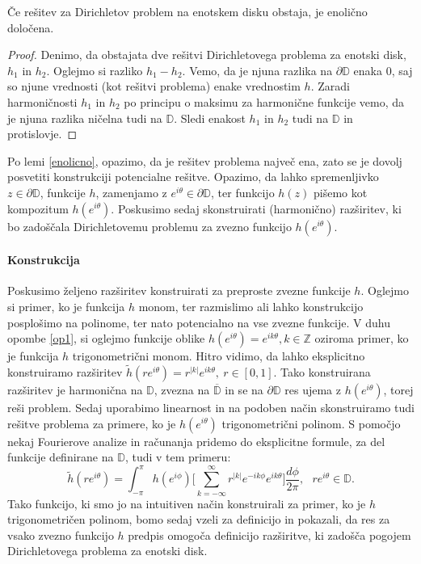 \documentclass[mat1]{fmfdelo}
\begin{document}
    \begin{lema}
        \label{enolicno}
        Če rešitev za Dirichletov problem na enotskem disku obstaja, je enolično določena.
    \end{lema}
    \begin{proof}
        Denimo, da obstajata dve rešitvi Dirichletovega problema za enotski disk, $h_1$ in $h_2$.
        Oglejmo si razliko $h_1 - h_2$. Vemo, da je njuna razlika na $\partial \mathbb{D}$ enaka $0$, saj so njune vrednosti (kot rešitvi problema) enake vrednostim $h$. 
        Zaradi harmoničnosti $h_1$ in $h_2$ po principu o maksimu za harmonične funkcije vemo, da je njuna razlika ničelna tudi na $\mathbb{D}$. Sledi enakost $h_1$ in $h_2$ tudi na $\mathbb{D}$ in protislovje. 
    \end{proof}

    \begin{opomba}
        \label{op1}
        Po lemi \ref{enolicno}, opazimo, da je rešitev problema največ ena, zato se je dovolj posvetiti konstrukciji potencialne rešitve. 
        Opazimo, da lahko spremenljivko $z \in \partial \mathbb{D}$, funkcije $h$, zamenjamo z $e^{i \theta} \in \partial \mathbb{D}$, ter funkcijo $h(z)$ pišemo kot kompozitum $h(e^{i \theta})$.
        Poskusimo sedaj skonstruirati (harmonično) razširitev, ki bo zadoščala Dirichletovemu problemu za zvezno funkcijo $h(e^{i \theta})$.
    \end{opomba}

    \paragraph[short]{\textbf{Konstrukcija}}
    Poskusimo željeno razširitev konstruirati za preproste zvezne funkcije $h$. Oglejmo si primer, ko je funkcija $h$ monom, ter razmislimo ali lahko konstrukcijo posplošimo na polinome, ter nato potencialno na vse zvezne funkcije. 
    V duhu opombe \ref{op1}, si oglejmo funkcije oblike $h(e^{i \theta}) = e^{i k \theta}, k \in \mathbb{Z}$ oziroma primer, ko je funkcija $h$ trigonometrični monom. Hitro vidimo, da lahko eksplicitno konstruiramo razširitev $\widetilde{h}(r e^{i \theta}) = r^{|k|}e^{i k \theta},~r \in [0, 1]$. 
    Tako konstruirana razširitev je harmonična na $\mathbb{D}$, zvezna na $\overline{\mathbb{D}}$ in se na $\partial \mathbb{D}$ res ujema z $h(e^{i \theta})$, torej reši problem. Sedaj uporabimo linearnost in na podoben način skonstruiramo tudi rešitve problema za primere, ko je $h(e^{i \theta})$ trigonometrični polinom. 
    S pomočjo nekaj Fourierove analize in računanja pridemo do eksplicitne formule, za del funkcije definirane na $\mathbb{D}$, tudi v tem primeru:
    $$
        \widetilde{h}(r e^{i \theta}) = \int_{-\pi}^{\pi}{h(e^{i \phi}) \bigg[\sum_{k = - \infty}^{\infty} r^{|k|} e^{- i k \phi} e^{i k \theta}} \bigg]\frac{d \phi}{2 \pi}, ~~~ r e^{i\theta} \in \mathbb{D}.
    $$
    Tako funkcijo, ki smo jo na intuitiven način konstruirali za primer, ko je $h$ trigonometričen polinom, bomo sedaj vzeli za definicijo in pokazali, da res za vsako zvezno funkcijo $h$ predpis omogoča definicijo razširitve, ki zadošča pogojem Dirichletovega problema za enotski disk. 
\end{document}
